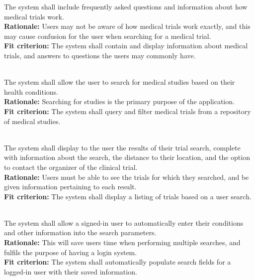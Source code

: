 \documentclass[12pt, titlepage]{article}
\newcounter{FR_Counter}
\begin{document}
The system shall include frequently asked questions and information about how medical trials work.\\
\textbf{Rationale:}
Users may not be aware of how medical trials work exactly, and this may cause confusion for the user when searching for a medical trial.\\
\textbf{Fit criterion:}
The system shall contain and display information about medical trials, and answers to questions the users may commonly have.\\~\\
\addtocounter{FR_Counter}{1}

The system shall allow the user to search for medical studies based on their health conditions.\\
\textbf{Rationale:}
Searching for studies is the primary purpose of the application.\\
\textbf{Fit criterion:}
The system shall query and filter medical trials from a repository of medical studies.\\~\\
\addtocounter{FR_Counter}{1}

The system shall display to the user the results of their trial search, complete with information about the search, the distance to their location, and the option to contact the organizer of the clinical trial. \\
\textbf{Rationale:}
Users must be able to see the trials for which they searched, and be given information pertaining to each result.\\
\textbf{Fit criterion:}
The system shall display a listing of trials based on a user search.\\~\\
\addtocounter{FR_Counter}{1}

The system shall allow a signed-in user to automatically enter their conditions and other information into the search parameters. \\
\textbf{Rationale:}
This will save users time when performing multiple searches, and fulfils the purpose of having a login system.\\
\textbf{Fit criterion:}
The system shall automatically populate search fields for a logged-in user with their saved information. \\~\\
\addtocounter{FR_Counter}{1}
\end{document}
